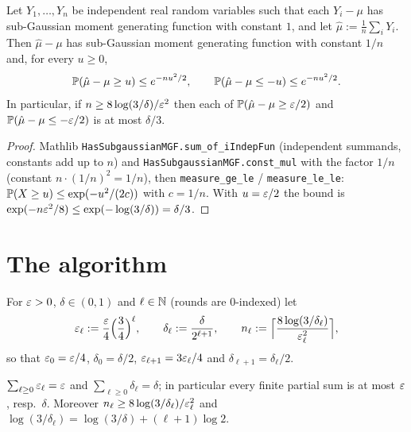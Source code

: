 \begin{lemma}\label{lem:pm_empmean_tail}
\leanok
{}
Let $Y_1,\dots,Y_n$ be independent real random variables such that each $Y_i - \mu$ has
sub-Gaussian moment generating function with constant $1$, and let $\hat\mu := \frac1n\sum_iY_i$.
Then $\hat\mu - \mu$ has sub-Gaussian moment generating function with constant $1/n$ and, for
every $u\ge0$,
\[
  \mathbb{P}(\hat\mu - \mu\ge u)\le e^{-nu^2/2},\qquad \mathbb{P}(\hat\mu-\mu\le -u)\le e^{-nu^2/2}.
\]
In particular, if $n\ge 8\log(3/\delta)/\varepsilon^2$ then each of $\mathbb{P}(\hat\mu-\mu\ge\varepsilon/2)$ and
$\mathbb{P}(\hat\mu-\mu\le-\varepsilon/2)$ is at most $\delta/3$.
\end{lemma}

\begin{proof}
\leanok
Mathlib \texttt{HasSubgaussianMGF.sum\_of\_iIndepFun} (independent summands, constants add up to $n$) and
\texttt{HasSubgaussianMGF.const\_mul} with the factor $1/n$ (constant $n\cdot(1/n)^2 = 1/n$),
then \texttt{measure\_ge\_le} / \texttt{measure\_le\_le}: $\mathbb{P}(X\ge u)\le\exp(-u^2/(2c))$ with
$c = 1/n$. With $u = \varepsilon/2$ the bound is $\exp(-n\varepsilon^2/8)\le\exp(-\log(3/\delta)) = \delta/3$.
\end{proof}

\section{The algorithm}
\label{sec:pre_median_alg}

\begin{definition}\label{def:me_schedule}
\leanok
For $\varepsilon>0$, $\delta\in(0,1)$ and $\ell\in\mathbb{N}$ (rounds are $0$-indexed) let
\[
  \varepsilon_\ell := \frac{\varepsilon}{4}\Big(\frac34\Big)^\ell,\qquad
  \delta_\ell := \frac{\delta}{2^{\ell+1}},\qquad
  n_\ell := \Big\lceil\frac{8\log(3/\delta_\ell)}{\varepsilon_\ell^2}\Big\rceil ,
\]
so that $\varepsilon_0 = \varepsilon/4$, $\delta_0 = \delta/2$, $\varepsilon_{\ell+1} = 3\varepsilon_\ell/4$ and
$\delta_{\ell+1} = \delta_\ell/2$.
\end{definition}

\begin{lemma}\label{lem:me_schedule_sums}
\leanok
{}
$\sum_{\ell\ge0}\varepsilon_\ell = \varepsilon$ and $\sum_{\ell\ge0}\delta_\ell = \delta$; in particular every
finite partial sum is at most $\varepsilon$, resp.\ $\delta$. Moreover $n_\ell\ge 8\log(3/\delta_\ell)/\varepsilon_\ell^2$
and $\log(3/\delta_\ell) = \log(3/\delta) + (\ell+1)\log 2$.
\end{lemma}


